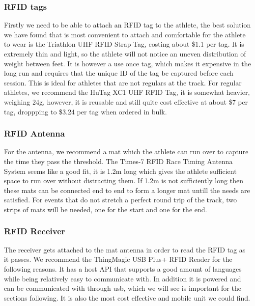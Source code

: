 \documentclass{article}
\begin{document}
\subsubsection{RFID tags}
Firstly we need to be able to attach an RFID tag to the athlete, the best solution we have found that is most convenient to attach and comfortable for the athlete to wear is the Triathlon UHF RFID Strap Tag, costing about \$1.1 per tag. It is extremely thin and light, so the athlete will not notice an uneven distribution of weight between feet. It is however a use once tag, which makes it expensive in the long run and requires that the unique ID of the tag be captured before each session. This is ideal for athletes that are not regulars at the track. For regular athletes, we recommend the HuTag XC1 UHF RFID Tag, it is somewhat heavier, weighing 24g, however, it is reusable and still quite cost effective at about \$7 per tag, droppping to \$3.24 per tag when ordered in bulk.

\subsubsection{RFID Antenna}
For the antenna, we recommend a mat which the athlete can run over to capture the time they pass the threshold. The Times-7 RFID Race Timing Antenna System seems like a good fit, it is 1.2m long which gives the athlete sufficient space to run over without distracting them. If 1.2m is not sufficiently long then these mats can be connected end to end to form a longer mat untill the needs are satisfied. For events that do not stretch a perfect round trip of the track, two strips of mats will be needed, one for the start and one for the end.

\subsubsection{RFID Receiver}
The receiver gets attached to the mat antenna in order to read the RFID tag as it passes. We recommend the ThingMagic USB Plus+ RFID Reader for the following reasons. It has a host API that supports a good amount of languages while being relatively easy to communicate with. In addition it is powered and can be communicated with through usb, which we will see is important for the sections following. It is also the most cost effective and mobile unit we could find.
\end{document}
